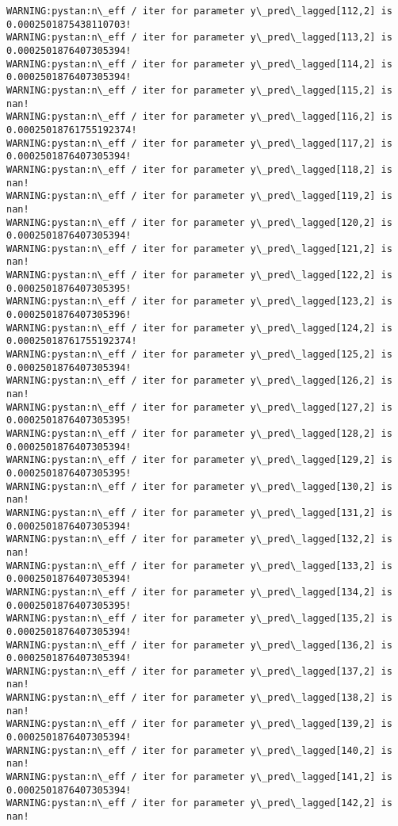 \documentclass[11pt]{article}
\begin{document}
\begin{Verbatim}[commandchars=\\\{\}]
WARNING:pystan:n\_eff / iter for parameter y\_pred\_lagged[112,2] is 0.0002501875438110703!
WARNING:pystan:n\_eff / iter for parameter y\_pred\_lagged[113,2] is 0.0002501876407305394!
WARNING:pystan:n\_eff / iter for parameter y\_pred\_lagged[114,2] is 0.0002501876407305394!
WARNING:pystan:n\_eff / iter for parameter y\_pred\_lagged[115,2] is nan!
WARNING:pystan:n\_eff / iter for parameter y\_pred\_lagged[116,2] is 0.00025018761755192374!
WARNING:pystan:n\_eff / iter for parameter y\_pred\_lagged[117,2] is 0.0002501876407305394!
WARNING:pystan:n\_eff / iter for parameter y\_pred\_lagged[118,2] is nan!
WARNING:pystan:n\_eff / iter for parameter y\_pred\_lagged[119,2] is nan!
WARNING:pystan:n\_eff / iter for parameter y\_pred\_lagged[120,2] is 0.0002501876407305394!
WARNING:pystan:n\_eff / iter for parameter y\_pred\_lagged[121,2] is nan!
WARNING:pystan:n\_eff / iter for parameter y\_pred\_lagged[122,2] is 0.0002501876407305395!
WARNING:pystan:n\_eff / iter for parameter y\_pred\_lagged[123,2] is 0.0002501876407305396!
WARNING:pystan:n\_eff / iter for parameter y\_pred\_lagged[124,2] is 0.00025018761755192374!
WARNING:pystan:n\_eff / iter for parameter y\_pred\_lagged[125,2] is 0.0002501876407305394!
WARNING:pystan:n\_eff / iter for parameter y\_pred\_lagged[126,2] is nan!
WARNING:pystan:n\_eff / iter for parameter y\_pred\_lagged[127,2] is 0.0002501876407305395!
WARNING:pystan:n\_eff / iter for parameter y\_pred\_lagged[128,2] is 0.0002501876407305394!
WARNING:pystan:n\_eff / iter for parameter y\_pred\_lagged[129,2] is 0.0002501876407305395!
WARNING:pystan:n\_eff / iter for parameter y\_pred\_lagged[130,2] is nan!
WARNING:pystan:n\_eff / iter for parameter y\_pred\_lagged[131,2] is 0.0002501876407305394!
WARNING:pystan:n\_eff / iter for parameter y\_pred\_lagged[132,2] is nan!
WARNING:pystan:n\_eff / iter for parameter y\_pred\_lagged[133,2] is 0.0002501876407305394!
WARNING:pystan:n\_eff / iter for parameter y\_pred\_lagged[134,2] is 0.0002501876407305395!
WARNING:pystan:n\_eff / iter for parameter y\_pred\_lagged[135,2] is 0.0002501876407305394!
WARNING:pystan:n\_eff / iter for parameter y\_pred\_lagged[136,2] is 0.0002501876407305394!
WARNING:pystan:n\_eff / iter for parameter y\_pred\_lagged[137,2] is nan!
WARNING:pystan:n\_eff / iter for parameter y\_pred\_lagged[138,2] is nan!
WARNING:pystan:n\_eff / iter for parameter y\_pred\_lagged[139,2] is 0.0002501876407305394!
WARNING:pystan:n\_eff / iter for parameter y\_pred\_lagged[140,2] is nan!
WARNING:pystan:n\_eff / iter for parameter y\_pred\_lagged[141,2] is 0.0002501876407305394!
WARNING:pystan:n\_eff / iter for parameter y\_pred\_lagged[142,2] is nan!

\end{Verbatim}
\end{document}
